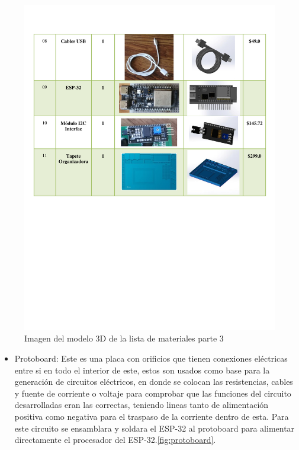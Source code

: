 \begin{itemize}
    \newpage
    \newpage
    \begin{figure}[H]
        \centering
        \includegraphics[trim = {1mm 1mm 1mm 1mm},clip,scale=0.5]{19/Img/listaDeMateriales 3.pdf}
        \caption{Imagen del modelo 3D de la lista de materiales parte 3}
        \label{fig:lista3}
    \end{figure}
    
        \begin{itemize}
            \item Protoboard: Este es una placa con orificios que tienen conexiones eléctricas entre si en todo el interior de este, estos son usados como base para la generación de circuitos eléctricos, en donde se colocan las resistencias, cables y fuente de corriente o voltaje para comprobar que las funciones del circuito desarrolladas eran las correctas, teniendo lineas tanto de alimentación positiva como negativa para el traspaso de la corriente dentro de esta. Para este circuito se ensamblara y soldara  el ESP-32 al protoboard para alimentar directamente el procesador del ESP-32.\ref{fig:protoboard}.
    

\end{itemize}
\end{itemize}
